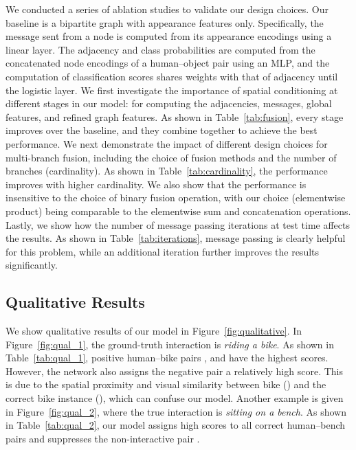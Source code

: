 \documentclass[10pt,twocolumn,letterpaper]{article}
\begin{document}
We conducted a series of ablation studies to validate our design choices. Our baseline is a bipartite graph with appearance features only. Specifically, the message sent from a node is computed from its appearance encodings using a linear layer. The adjacency and class probabilities are computed from the concatenated node encodings of a human--object pair using an MLP, and the computation of classification scores shares weights with that of adjacency until the logistic layer.
We first investigate the importance of spatial conditioning at different stages in our model: for computing the adjacencies, messages, global features, and refined graph features. As shown in Table~\ref{tab:fusion}, every stage improves over the baseline, and they combine together to achieve the best performance.
We next demonstrate the impact of different design choices for multi-branch fusion, including the choice of fusion methods and the number of branches (cardinality). As shown in Table~\ref{tab:cardinality}, the performance improves with higher cardinality.
We also show that the performance is insensitive to the choice of binary fusion operation, with our choice (elementwise product) being comparable to the elementwise sum and concatenation operations.
Lastly, we show how the number of message passing iterations at test time affects the results. As shown in Table~\ref{tab:iterations}, message passing is clearly helpful for this problem, while an additional iteration further improves the results significantly.






\subsection{Qualitative Results}

We show qualitative results of our model in Figure~\ref{fig:qualitative}. In Figure~\ref{fig:qual_1}, the ground-truth interaction is \textit{riding a bike}. As shown in Table~\ref{tab:qual_1}, positive human--bike pairs ,  and  have the highest scores. However, the network also assigns the negative pair  a relatively high score. This is due to the spatial proximity and visual similarity between bike () and the correct bike instance (), which can confuse our model. Another example is given in Figure~\ref{fig:qual_2}, where the true interaction is \textit{sitting on a bench}. As shown in Table~\ref{tab:qual_2}, our model assigns high scores to all correct human--bench pairs and suppresses the non-interactive pair .
\end{document}
